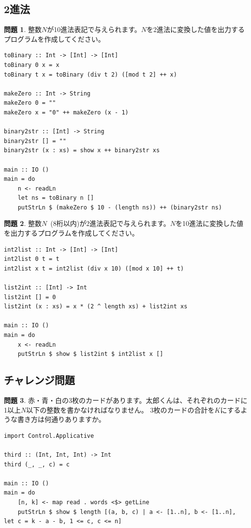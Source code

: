 \documentclass[12pt,a4paper,dvipdfmx,fleqn]{article}%
\theoremstyle{definition}
\newtheorem*{toi*}{問題}
\theoremstyle{definition}
\theoremstyle{definition}
\begin{document}
\subsection{2進法}\label{2進法}
\begin{toi*}
    整数$N$が10進法表記で与えられます。$N$を2進法に変換した値を出力するプログラムを作成してください。
\end{toi*}
\begin{lstlisting}[caption=A04.hs,label=A04]
toBinary :: Int -> [Int] -> [Int]
toBinary 0 x = x
toBinary t x = toBinary (div t 2) ([mod t 2] ++ x)

makeZero :: Int -> String
makeZero 0 = ""
makeZero x = "0" ++ makeZero (x - 1)

binary2str :: [Int] -> String
binary2str [] = ""
binary2str (x : xs) = show x ++ binary2str xs

main :: IO ()
main = do
    n <- readLn
    let ns = toBinary n []
    putStrLn $ (makeZero $ 10 - (length ns)) ++ (binary2str ns)
\end{lstlisting}
\begin{toi*}
    整数$N$~(8桁以内)が2進法表記で与えられます。$N$を10進法に変換した値を出力するプログラムを作成してください。
\end{toi*}
\begin{lstlisting}[caption=B04.hs,label=B04]
int2list :: Int -> [Int] -> [Int]
int2list 0 t = t
int2list x t = int2list (div x 10) ([mod x 10] ++ t)

list2int :: [Int] -> Int
list2int [] = 0
list2int (x : xs) = x * (2 ^ length xs) + list2int xs

main :: IO ()
main = do
    x <- readLn
    putStrLn $ show $ list2int $ int2list x []
\end{lstlisting}
\subsection{チャレンジ問題}\label{チャレンジ問題1}
\begin{toi*}
    赤・青・白の3枚のカードがあります。太郎くんは、それぞれのカードに1以上$N$以下の整数を書かなければなりません。
    3枚のカードの合計を$K$にするような書き方は何通りありますか。
\end{toi*}
\begin{lstlisting}[caption=A05.hs,label=A05]
import Control.Applicative

third :: (Int, Int, Int) -> Int
third (_, _, c) = c

main :: IO ()
main = do
    [n, k] <- map read . words <$> getLine
    putStrLn $ show $ length [(a, b, c) | a <- [1..n], b <- [1..n], let c = k - a - b, 1 <= c, c <= n]
\end{lstlisting}
\end{document}

